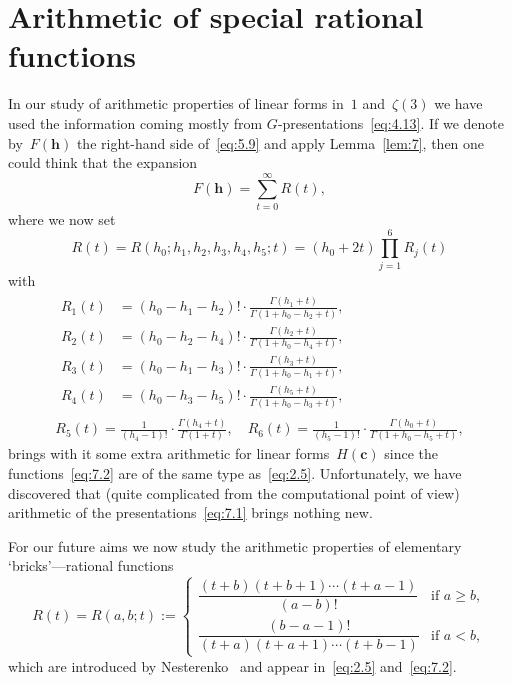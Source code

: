 \documentclass[a4paper,twoside]{article}
\numberwithin{equation}{section}
\renewcommand{\[}{\lfloor}
\renewcommand{\]}{\rfloor}
\newcommand{\<}{\langle}
\renewcommand{\>}{\rangle}
\newcommand{\bc}{\boldsymbol c}
\newcommand{\bh}{\boldsymbol h}
\begin{document}
\section{Arithmetic of special rational functions}
\label{sec:7}
In our study of arithmetic properties of linear forms in~$1$ and~$\zeta(3)$
we have used the information coming mostly from
$G$-presentations~\eqref{eq:4.13}.
If we denote by~$F(\bh)$ the right-hand side of~\eqref{eq:5.9}
and apply Lemma~\ref{lem:7}, then one could think that the expansion
\begin{equation}
F(\bh)=\sum_{t=0}^\infty R(t),
\label{eq:7.1}
\end{equation}
where we now set
$$
R(t)=R(h_0;h_1,h_2,h_3,h_4,h_5;t)
=(h_0+2t)\prod_{j=1}^6R_j(t)
$$
with
\begin{equation}
\begin{gathered}
\begin{aligned}
R_1(t)&=(h_0-h_1-h_2)!\cdot\frac{\Gamma(h_1+t)}{\Gamma(1+h_0-h_2+t)},
\\
R_2(t)&=(h_0-h_2-h_4)!\cdot\frac{\Gamma(h_2+t)}{\Gamma(1+h_0-h_4+t)},
\\
R_3(t)&=(h_0-h_1-h_3)!\cdot\frac{\Gamma(h_3+t)}{\Gamma(1+h_0-h_1+t)},
\\
R_4(t)&=(h_0-h_3-h_5)!\cdot\frac{\Gamma(h_5+t)}{\Gamma(1+h_0-h_3+t)},
\end{aligned}
\\
R_5(t)=\frac1{(h_4-1)!}\cdot\frac{\Gamma(h_4+t)}{\Gamma(1+t)},
\quad
R_6(t)=\frac1{(h_5-1)!}\cdot\frac{\Gamma(h_0+t)}{\Gamma(1+h_0-h_5+t)},
\end{gathered}
\label{eq:7.2}
\end{equation}
brings with it some extra arithmetic for linear forms~$H(\bc)$
since the functions~\eqref{eq:7.2} are of the same type as~\eqref{eq:2.5}.
Unfortunately, we have discovered that (quite complicated from the
computational point of view) arithmetic of the presentations~\eqref{eq:7.1}
brings nothing new.

For our future aims we now study the arithmetic properties
of elementary `bricks'---rational functions
\begin{equation}
R(t)=R(a,b;t):=\begin{cases}
\dfrac{(t+b)(t+b+1)\dotsb(t+a-1)}{(a-b)!}
& \mbox{if $a\ge b$}, \\
\dfrac{(b-a-1)!}{(t+a)(t+a+1)\dotsb(t+b-1)}
& \mbox{if $a<b$},
\end{cases}
\label{eq:7.3}
\end{equation}
which are introduced by Nesterenko~\cite{Ne2,Ne3}
and appear in~\eqref{eq:2.5} and~\eqref{eq:7.2}.
\end{document}
